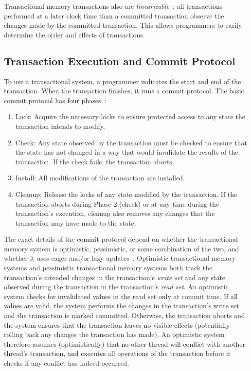 Transactional memory transactions also are \emph{linearizable}~\cite{linearizability}: all transactions performed at a later clock time than a committed transaction observe the changes made by the committed transaction. This allows programmers to easily determine the order and effects of transactions.

\subsection{Transaction Execution and Commit Protocol}
To use a transactional system, a programmer indicates the start and end of the transaction. When the transaction finishes, it runs a commit protocol. The basic commit protocol has four phases~\cite{harristm}:
\begin{enumerate}
    \item Lock: Acquire the necessary locks to ensure protected access to any state the transaction intends to modify.
    \item Check: Any state observed by the transaction must be checked to ensure that the state has not changed in a way that would invalidate the results of the transaction. If the check fails, the transaction aborts.
    \item Install: All modifications of the transaction are installed.
    \item Cleanup: Release the locks of any state modified by the transaction. If the transaction aborts during Phase 2 (check) or at any time during the transaction's execution, cleanup also removes any changes that the transaction may have made to the state.
\end{enumerate}

The exact details of the commit protocol depend on whether the transactional memory system is optimistic, pessimistic, or some combination of the two, and whether it uses eager and/or lazy updates~\cite{harristm}. 
Optimistic transactional memory systems and pessimistic transactional memory systems both track the transaction's intended changes in the transaction's \emph{write set} and any state observed during the transaction in the transaction's \emph{read set}. 
An optimistic system checks for invalidated values in the read set only at commit time. If all values are valid, the system performs the changes in the transaction's write set and the transaction is marked committed. Otherwise, the transaction aborts and the system ensures that the transaction leaves no visible effects (potentially rolling back any changes the transaction has made). An optimistic system therefore assumes (optimistically) that no other thread will conflict with another thread's transaction, and executes all operations of the transaction before it checks if any conflict has indeed occurred.


